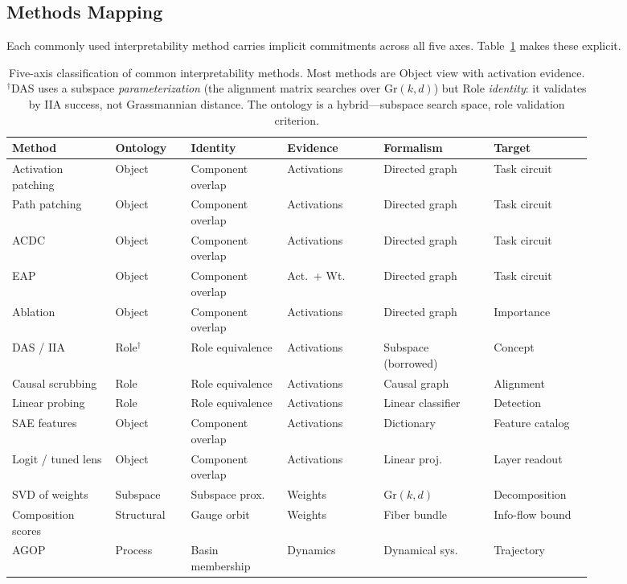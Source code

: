 \documentclass{article}
\newcommand{\Gr}{\mathrm{Gr}}
\begin{document}
\subsection{Methods Mapping}\label{sec:methods}

Each commonly used interpretability method carries implicit commitments
across all five axes.  Table~\ref{tab:methods} makes these explicit.

\begin{table}[H]
\centering
\small
\setlength{\tabcolsep}{3.5pt}
\begin{tabular}{p{0.15\linewidth}p{0.11\linewidth}p{0.14\linewidth}p{0.14\linewidth}p{0.16\linewidth}p{0.14\linewidth}}
\toprule
\textbf{Method} & \textbf{Ontology} & \textbf{Identity} & \textbf{Evidence} & \textbf{Formalism} & \textbf{Target} \\
\midrule
Activation patching & Object & Component overlap & Activations & Directed graph & Task circuit \\[2pt]
Path patching       & Object & Component overlap & Activations & Directed graph & Task circuit \\[2pt]
ACDC                & Object & Component overlap & Activations & Directed graph & Task circuit \\[2pt]
EAP                 & Object & Component overlap & Act.\ + Wt. & Directed graph & Task circuit \\[2pt]
Ablation            & Object & Component overlap & Activations & Directed graph & Importance \\[2pt]
DAS / IIA           & Role$^\dagger$   & Role equivalence  & Activations & Subspace (borrowed) & Concept \\[2pt]
Causal scrubbing    & Role   & Role equivalence  & Activations & Causal graph & Alignment \\[2pt]
Linear probing      & Role   & Role equivalence  & Activations & Linear classifier & Detection \\[2pt]
SAE features        & Object & Component overlap & Activations & Dictionary & Feature catalog \\[2pt]
Logit / tuned lens  & Object & Component overlap & Activations & Linear proj. & Layer readout \\[2pt]
SVD of weights      & Subspace & Subspace prox. & Weights & $\Gr(k,d)$ & Decomposition \\[2pt]
Composition scores  & Structural & Gauge orbit  & Weights & Fiber bundle & Info-flow bound \\[2pt]
AGOP                & Process & Basin membership  & Dynamics & Dynamical sys. & Trajectory \\
\bottomrule
\end{tabular}
\caption{Five-axis classification of common interpretability methods.  Most
  methods are Object view with activation evidence.
  $^\dagger$DAS uses a subspace \emph{parameterization} (the alignment
  matrix searches over $\Gr(k,d)$) but Role \emph{identity}: it
  validates by IIA success, not Grassmannian distance.  The ontology is
  a hybrid---subspace search space, role validation criterion.}
\label{tab:methods}
\end{table}
\end{document}
